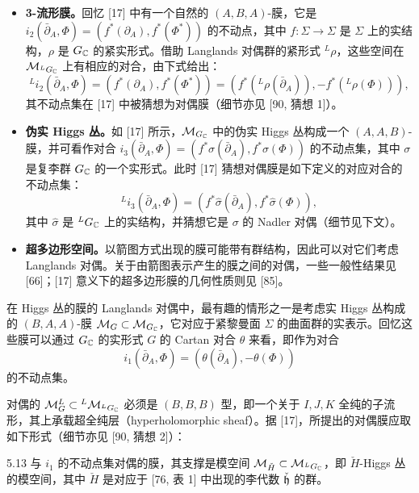 \begin{itemize}[leftmargin=1.4em,itemsep=1pt,topsep=1pt]
\item \textbf{3-流形膜。}回忆 [17] 中有一个自然的 $(A,B,A)$-膜，它是 $i_2(\bar\partial_A,\Phi) = (f^*(\partial_A), f^*(\Phi^*))$ 的不动点，其中 $f:\Sigma\to\Sigma$ 是 $\Sigma$ 上的实结构，$\rho$ 是 $G_{\mathbb{C}}$ 的紧实形式。借助 Langlands 对偶群的紧形式 ${}^{L}\rho$，这些空间在 $\mathcal{M}_{{}^{L}G_{\mathbb{C}}}$ 上有相应的对合，由下式给出：
\[
{}^{L}i_2(\bar\partial_A,\Phi) = (f^*(\partial_A), f^*(\Phi^*)) = (f^*({}^{L}\rho(\bar\partial_A)), -f^*({}^{L}\rho(\Phi))),
\]
其不动点集在 [17] 中被猜想为对偶膜（细节亦见 [90, 猜想 1]）。
\item \textbf{伪实 Higgs 丛。}如 [17] 所示，$\mathcal{M}_{G_{\mathbb{C}}}$ 中的伪实 Higgs 丛构成一个 $(A,A,B)$-膜，并可看作对合 $i_3(\bar\partial_A,\Phi) = (f^*\sigma(\bar\partial_A), f^*\sigma(\Phi))$ 的不动点集，其中 $\sigma$ 是复李群 $G_{\mathbb{C}}$ 的一个实形式。此时 [17] 猜想对偶膜是如下定义的对应对合的不动点集：
\[
{}^{L}i_3(\bar\partial_A,\Phi) = (f^*\hat\sigma(\bar\partial_A), f^*\hat\sigma(\Phi)),
\]
其中 $\hat\sigma$ 是 ${}^{L}G_{\mathbb{C}}$ 上的实结构，并猜想它是 $\sigma$ 的 Nadler 对偶（细节见下文）。
\item \textbf{超多边形空间。}以箭图方式出现的膜可能带有群结构，因此可以对它们考虑 Langlands 对偶。关于由箭图表示产生的膜之间的对偶，一些一般性结果见 [66]；[17] 意义下的超多边形膜的几何性质则见 [85]。
\end{itemize}

在 Higgs 丛的膜的 Langlands 对偶中，最有趣的情形之一是考虑实 Higgs 丛构成的 $(B,A,A)$-膜 $\mathcal{M}_G\subset\mathcal{M}_{G_{\mathbb{C}}}$，它对应于紧黎曼面 $\Sigma$ 的曲面群的实表示。回忆这些膜可以通过 $G_{\mathbb{C}}$ 的实形式 $G$ 的 Cartan 对合 $\theta$ 来看，即作为对合
\[
i_1(\bar\partial_A,\Phi) = (\theta(\bar\partial_A), -\theta(\Phi))
\]
的不动点集。

对偶的 $\mathcal{M}^{L}_{G}\subset{}^{L}\mathcal{M}_{{}^{L}G_{\mathbb{C}}}$ 必须是 $(B,B,B)$ 型，即一个关于 $I,J,K$ 全纯的子流形，其上承载超全纯层（hyperholomorphic sheaf）。据 [17]，所提出的对偶膜应取如下形式（细节亦见 [90, 猜想 2]）：

\begin{conj}{5.13}
与 $i_1$ 的不动点集对偶的膜，其支撑是模空间 $\mathcal{M}_{\check H}\subset\mathcal{M}_{{}^{L}G_{\mathbb{C}}}$，即 $\check H$-Higgs 丛的模空间，其中 $\check H$ 是对应于 [76, 表 1] 中出现的李代数 $\check{\mathfrak{h}}$ 的群。
\end{conj}

